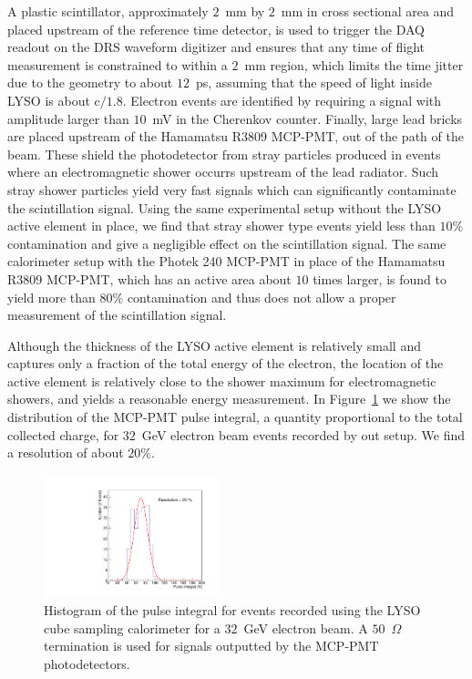 \documentclass[12pt]{article}
\begin{document}
A plastic scintillator, approximately $2$~mm by $2$~mm in cross sectional area
and placed upstream of the reference time detector, is used to trigger the DAQ
readout on the DRS waveform digitizer and ensures that any time of flight
measurement is constrained to within a $2$~mm region, which limits the time
jitter due to the geometry to about $12$~ps, assuming that the speed of light
inside LYSO is about $\mathrm{c}/1.8$. Electron events are identified by
requiring a signal with amplitude larger than $10$~mV in the Cherenkov counter.
Finally, large lead bricks are placed upstream of the Hamamatsu R3809 MCP-PMT,
out of the path of the beam. These shield the photodetector from stray particles
produced in events where an electromagnetic shower occurrs upstream of the lead
radiator. Such stray shower particles yield very fast signals which can
significantly contaminate the scintillation signal. Using the same experimental
setup without the LYSO active element in place, we find that stray shower type
events yield less than $10\%$ contamination and give a negligible effect on the
scintillation signal. The same calorimeter setup with the Photek 240 MCP-PMT in
place of the Hamamatsu R3809 MCP-PMT, which has an active area about $10$ times
larger, is found to yield more than $80\%$ contamination and thus does not allow
a proper measurement of the scintillation signal.

Although the thickness of the LYSO active element is relatively small and
captures only a fraction of the total energy of the electron, the location of
the active element is relatively close to the shower maximum for electromagnetic
showers, and yields a reasonable energy measurement. In
Figure~\ref{fig:LYSOCubeEnergy32GeV} we show the distribution of the MCP-PMT
pulse integral, a quantity proportional to the total collected charge, for
$32$~GeV electron beam events recorded by out setup. We find a resolution of
about $20\%$.


\begin{figure}[h] \centering
\includegraphics[width=0.45\textwidth]{figs/TOF_Electron_LYSOCube_32GeV_energy} 
\caption{ Histogram of the pulse integral for events recorded using
the LYSO cube sampling calorimeter for a $32$~GeV electron beam. A
$50$~$\Omega$ termination is used for signals outputted by the MCP-PMT
photodetectors. } 
\label{fig:LYSOCubeEnergy32GeV}
\end{figure}
\end{document}
